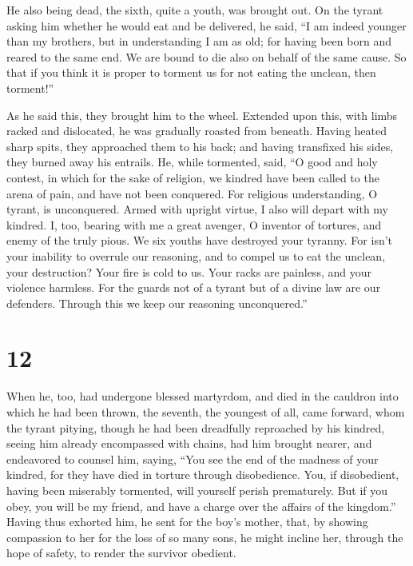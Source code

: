  He also being dead, the sixth, quite a youth, was brought
out. On the tyrant asking him whether he would eat and be delivered, he
said,  ``I am indeed younger than my brothers, but in
understanding I am as old;  for having been born and reared
to the same end. We are bound to die also on behalf of the same cause.
 So that if you think it is proper to torment us for not
eating the unclean, then torment!''

 As he said this, they brought him to the wheel.
 Extended upon this, with limbs racked and dislocated, he
was gradually roasted from beneath.  Having heated sharp
spits, they approached them to his back; and having transfixed his
sides, they burned away his entrails.  He, while tormented,
said, ``O good and holy contest, in which for the sake of religion, we
kindred have been called to the arena of pain, and have not been
conquered.  For religious understanding, O tyrant, is
unconquered.  Armed with upright virtue, I also will depart
with my kindred.  I, too, bearing with me a great avenger,
O inventor of tortures, and enemy of the truly pious.  We
six youths have destroyed your tyranny.  For isn't your
inability to overrule our reasoning, and to compel us to eat the
unclean, your destruction?  Your fire is cold to us. Your
racks are painless, and your violence harmless.  For the
guards not of a tyrant but of a divine law are our defenders. Through
this we keep our reasoning unconquered.''

\hypertarget{section-11}{%
\section{12}\label{section-11}}

 When he, too, had undergone blessed martyrdom, and died in
the cauldron into which he had been thrown, the seventh, the youngest of
all, came forward,  whom the tyrant pitying, though he had
been dreadfully reproached by his kindred,  seeing him
already encompassed with chains, had him brought nearer, and endeavored
to counsel him, saying,  ``You see the end of the madness of
your kindred, for they have died in torture through disobedience. You,
if disobedient, having been miserably tormented, will yourself perish
prematurely.  But if you obey, you will be my friend, and
have a charge over the affairs of the kingdom.''  Having
thus exhorted him, he sent for the boy's mother, that, by showing
compassion to her for the loss of so many sons, he might incline her,
through the hope of safety, to render the survivor obedient.

